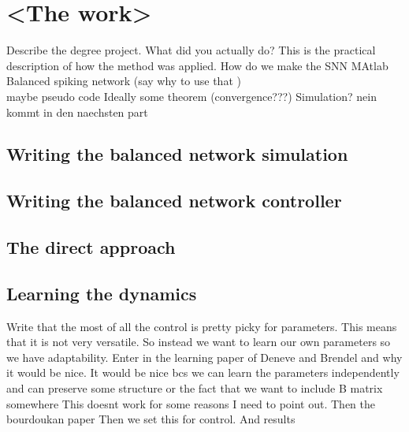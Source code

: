 	\chapter{<The work>}

Describe the degree project. What did you actually do? This is the practical description of how the method was applied.
How do we make the SNN
MAtlab
Balanced spiking network (say why to use that )\\
maybe pseudo code
Ideally some theorem (convergence???)
Simulation? nein kommt in den naechsten part

\section{Writing the balanced network simulation}

\section{Writing the balanced network controller}

\section{The direct approach}


\section{Learning the dynamics}
Write that the most of all the control is pretty picky for parameters.
This means that it is not very versatile.
So instead we want to learn our own parameters so we have adaptability.
Enter in the learning paper of Deneve and Brendel and why it would be nice. It would be nice bcs we can learn the parameters independently and can preserve some structure or the fact that we want to include B matrix somewhere
This doesnt work for some reasons I need to point out.
Then the bourdoukan paper
Then we set this for control.
And results